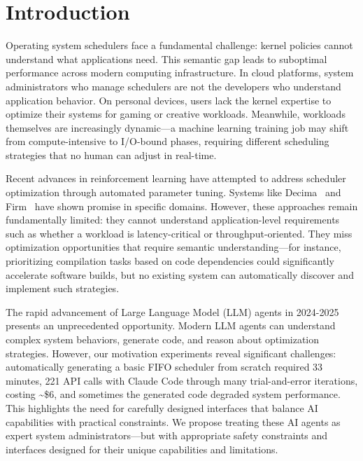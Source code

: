 \section{Introduction}
\label{sec:intro}

Operating system schedulers face a fundamental challenge: kernel policies cannot understand what applications need. This semantic gap leads to suboptimal performance across modern computing infrastructure. In cloud platforms, system administrators who manage schedulers are not the developers who understand application behavior. On personal devices, users lack the kernel expertise to optimize their systems for gaming or creative workloads. Meanwhile, workloads themselves are increasingly dynamic—a machine learning training job may shift from compute-intensive to I/O-bound phases, requiring different scheduling strategies that no human can adjust in real-time.

Recent advances in reinforcement learning have attempted to address scheduler optimization through automated parameter tuning. Systems like Decima~\cite{mao2019decima} and Firm~\cite{qiu2020firm} have shown promise in specific domains. However, these approaches remain fundamentally limited: they cannot understand application-level requirements such as whether a workload is latency-critical or throughput-oriented. They miss optimization opportunities that require semantic understanding—for instance, prioritizing compilation tasks based on code dependencies could significantly accelerate software builds, but no existing system can automatically discover and implement such strategies.

The rapid advancement of Large Language Model (LLM) agents in 2024-2025 presents an unprecedented opportunity. Modern LLM agents can understand complex system behaviors, generate code, and reason about optimization strategies. However, our motivation experiments reveal significant challenges: automatically generating a basic FIFO scheduler from scratch required 33 minutes, 221 API calls with Claude Code through many trial-and-error iterations, costing \textasciitilde\$6, and sometimes the generated code degraded system performance. This highlights the need for carefully designed interfaces that balance AI capabilities with practical constraints. We propose treating these AI agents as expert system administrators—but with appropriate safety constraints and interfaces designed for their unique capabilities and limitations.

